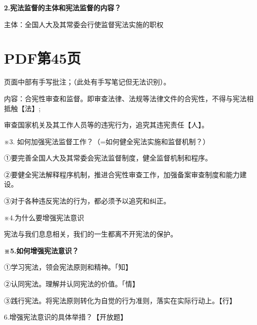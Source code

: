 \documentclass[lang=cn,11pt]{elegantbook}
\newcommand{\daofasym}[1]{{\daofasymbolfont #1}}
\newcommand{\daofasym}[1]{#1}
\begin{document}
\textbf{2.宪法监督的主体和宪法监督的内容？}\par

主体：全国人大及其常委会行使监督宪法实施的职权\par


\section*{PDF第45页}

\begin{note}[手写批注]
页面中部有手写批注；（此处有手写笔记但无法识别）。\par
\end{note}

内容：合宪性审查和监督。即审查法律、法规等法律文件的合宪性，不得与宪法相抵触【法】;\par

审查国家机关及其工作人员等的违宪行为，追究其违宪责任【人】。\par

※3. 如何加强宪法监督工作？（=如何健全宪法实施和监督机制？）\par

\daofasym{①}要完善全国人大及其常委会宪法监督制度，健全监督机制和程序。\par

\daofasym{②}要健全宪法解释程序机制，推进合宪性审查工作，加强备案审查制度和能力建设。\par

\daofasym{③}对于各种违反宪法的行为，都必须予以追究和纠正。\par

※4.为什么要增强宪法意识\par

宪法与我们息息相关，我们的一生都离不开宪法的保护。\par

\textbf{※5.如何增强宪法意识？}\par

\daofasym{①}学习宪法，领会宪法原则和精神。「知】\par

\daofasym{②}认同宪法。理解并认同宪法的价值。「情】\par

\daofasym{③}践行宪法。将宪法原则转化为自觉的行为准则，落实在实际行动上。【行】\par

6.增强宪法意识的具体举措？【开放题】\par
\end{document}
